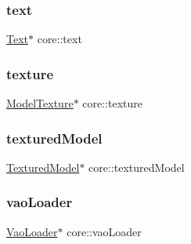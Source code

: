 \mbox{\label{namespacecore_a7f65917b3299aa904f0516343ec522db}} 
\subsubsection{\texorpdfstring{text}{text}}
{\footnotesize\ttfamily \hyperlink{classfont_1_1Text}{Text}$\ast$ core\+::text}

\mbox{\label{namespacecore_a0738503bf610d37d44b4938dc024bfcc}} 
\subsubsection{\texorpdfstring{texture}{texture}}
{\footnotesize\ttfamily \hyperlink{classtexture_1_1Texture}{Model\+Texture}$\ast$ core\+::texture}

\mbox{\label{namespacecore_ad4d5c25548862489d6a237342748ad74}} 
\subsubsection{\texorpdfstring{textured\+Model}{texturedModel}}
{\footnotesize\ttfamily \hyperlink{classmodel_1_1TexturedModel}{Textured\+Model}$\ast$ core\+::textured\+Model}

\mbox{\label{namespacecore_a78dd24784c415d3759a0f71b8f4f9f81}} 
\subsubsection{\texorpdfstring{vao\+Loader}{vaoLoader}}
{\footnotesize\ttfamily \hyperlink{classcore_1_1VaoLoader}{Vao\+Loader}$\ast$ core\+::vao\+Loader}

